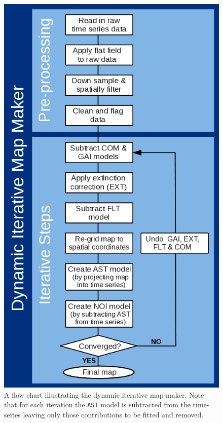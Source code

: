 \documentclass[twoside,11pt]{article}
\newenvironment{latexonly}{}{}
\renewcommand{\_}{\texttt{\symbol{95}}}
\begin{document}
\begin{latexonly}
\begin{figure}
\centering\includegraphics[width=0.78\linewidth]{sc21_flow_dimm_blue}
\caption[Flowchart of the map-maker]{
   \small A flow chart illustrating the dynamic
   iterative map-maker. Note that for each iteration the \texttt{AST}
   model is subtracted from the time-series leaving only those
   contributions to be fitted and removed.
}
\label{fig:dimm}
\end{figure}
\end{latexonly}
\end{document}
